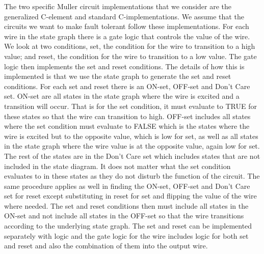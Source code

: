 \documentclass[12pt]{report}
\begin{document}
The two specific Muller circuit implementations that we consider are the generalized C-element and standard C-implementations.  We assume that the circuits we want to make fault tolerant follow these implementations.    
For each wire in the state graph there is a gate logic that controls the value of the wire.  We look at two conditions, set, the condition for the wire to transition to a high value; and reset, the condition for the wire to transition to a low value.  The gate logic then implements the set and reset conditions. The details of how this is implemented is that we use the state graph to generate the set and reset conditions. For each set and reset there is an ON-set, OFF-set and Don't Care set.  ON-set are all states in the state graph where the wire is excited and a transition will occur.  That is for the set condition, it must evaluate to TRUE for these states so that the wire can transition to high.  OFF-set includes all states where the set condition must evaluate to FALSE which is the states where the wire is excited but to the opposite value, which is low for set, as well as all states in the state graph where the wire value is at the opposite value, again low for set.  The rest of the states are in the Don't Care set which includes states that are not included in the state diagram.  It does not matter what the set condition evaluates to in these states as they do not disturb the function of the circuit. The same procedure applies as well in finding the ON-set, OFF-set and Don't Care set for reset except substituting in reset for set and flipping the value of the wire where needed. The set and reset conditions then must include all states in the ON-set and not include all states in the OFF-set so that the wire transitions according to the underlying state graph.  The set and reset can be implemented separately with logic and the gate logic for the wire includes logic for both set and reset and also the combination of them into the output wire.   \\   %
\end{document}
